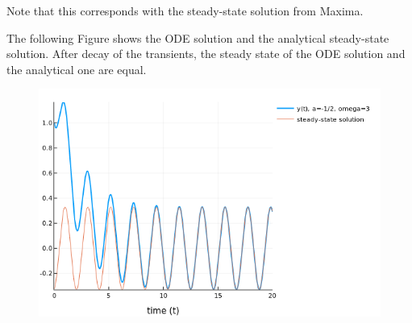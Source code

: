 Note that this corresponds with the steady-state solution from Maxima.

The following Figure shows the ODE solution and the analytical steady-state solution. After decay of the transients, the steady state of the ODE solution and the analytical one are equal.

\begin{figure}[H]
	\includegraphics[scale=0.5]{images/ode_02_06.png}
\end{figure}
